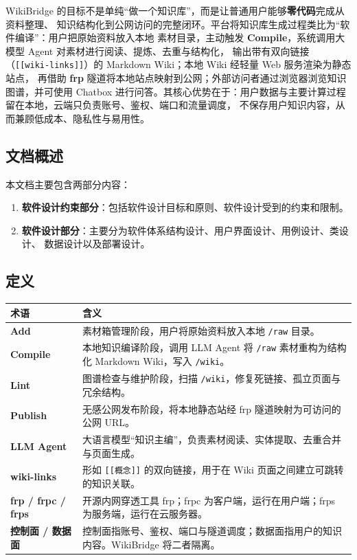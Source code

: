 \documentclass[UTF8,a4paper,12pt]{ctexart}
\newcommand{\keypoint}[1]{\textcolor{whu}{\textbf{#1}}}
\newcommand{\code}[1]{\texttt{#1}}
\begin{document}
WikiBridge 的目标不是单纯“做一个知识库”，而是让普通用户能够\keypoint{零代码}完成从资料整理、
知识结构化到公网访问的完整闭环。平台将知识库生成过程类比为“软件编译”：用户把原始资料放入本地
素材目录，主动触发 \keypoint{Compile}，系统调用大模型 Agent 对素材进行阅读、提炼、去重与结构化，
输出带有双向链接（\code{[[wiki-links]]}）的 Markdown Wiki；本地 Wiki 经轻量 Web 服务渲染为静态站点，
再借助 \keypoint{frp} 隧道将本地站点映射到公网；外部访问者通过浏览器浏览知识图谱，并可使用 Chatbox
进行问答。其核心优势在于：用户数据与主要计算过程留在本地，云端只负责账号、鉴权、端口和流量调度，
不保存用户知识内容，从而兼顾低成本、隐私性与易用性。

\subsection{文档概述}
本文档主要包含两部分内容：
\begin{enumerate}[leftmargin=2.2em]
  \item \textbf{软件设计约束部分}：包括软件设计目标和原则、软件设计受到的约束和限制。
  \item \textbf{软件设计部分}：主要分为软件体系结构设计、用户界面设计、用例设计、类设计、
        数据设计以及部署设计。
\end{enumerate}

\subsection{定义}
\begin{longtable}{>{\bfseries}p{3.2cm} p{11.2cm}}
  \toprule
  术语 & 含义\\
  \midrule\endhead
  Add & 素材箱管理阶段，用户将原始资料放入本地 \code{/raw} 目录。\\
  Compile & 本地知识编译阶段，调用 LLM Agent 将 \code{/raw} 素材重构为结构化 Markdown Wiki，写入 \code{/wiki}。\\
  Lint & 图谱检查与维护阶段，扫描 \code{/wiki}，修复死链接、孤立页面与冗余结构。\\
  Publish & 无感公网发布阶段，将本地静态站经 frp 隧道映射为可访问的公网 URL。\\
  LLM Agent & 大语言模型“知识主编”，负责素材阅读、实体提取、去重合并与页面生成。\\
  wiki-links & 形如 \code{[[概念]]} 的双向链接，用于在 Wiki 页面之间建立可跳转的知识关联。\\
  frp / frpc / frps & 开源内网穿透工具 frp；frpc 为客户端，运行在用户端；frps 为服务端，运行在云服务器。\\
  控制面 / 数据面 & 控制面指账号、鉴权、端口与隧道调度；数据面指用户的知识内容。WikiBridge 将二者隔离。\\
  \bottomrule
\end{longtable}
\end{document}
